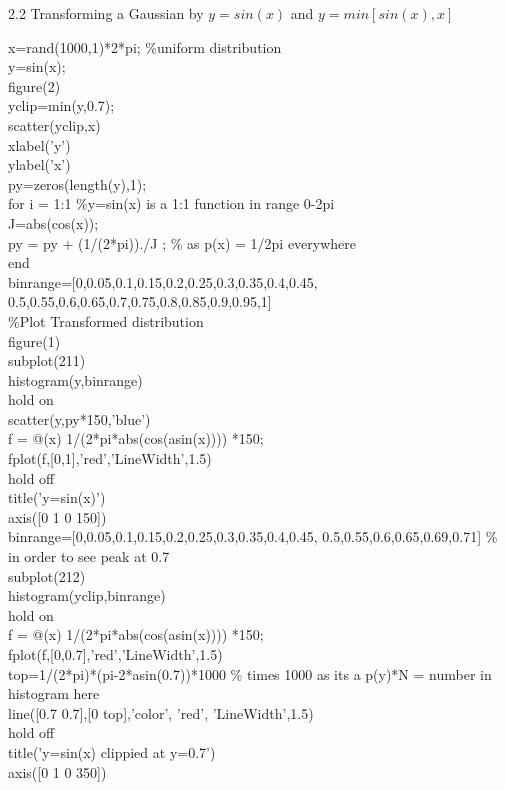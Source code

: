 \documentclass[twoside,twocolumn]{article}
\begin{document}
\begin{large}
2.2 Transforming a Gaussian by $y=sin(x)$ and $y=min[sin(x),x]$
\end{large}
\newline
\begin{itshape}
x=rand(1000,1)*2*pi; \%uniform distribution\\
y=sin(x);\\
figure(2)\\
yclip=min(y,0.7);\\
scatter(yclip,x)\\
xlabel('y')\\
ylabel('x')\\
py=zeros(length(y),1);\\
for i = 1:1 \%y=sin(x) is a 1:1 function in range 0-2pi  \\
    J=abs(cos(x));\\
    py = py + (1/(2*pi))./J ; \% as p(x) = 1/2pi everywhere \\
end\\

binrange=[0,0.05,0.1,0.15,0.2,0.25,0.3,0.35,0.4,0.45, 0.5,0.55,0.6,0.65,0.7,0.75,0.8,0.85,0.9,0.95,1]\\
\%Plot Transformed distribution\\
figure(1)\\
subplot(211)\\
histogram(y,binrange)\\
hold on\\
scatter(y,py*150,'blue')\\
f = @(x) 1/(2*pi*abs(cos(asin(x)))) *150;\\ 
fplot(f,[0,1],'red','LineWidth',1.5)\\
hold off\\
title('y=sin(x)')\\
axis([0 1 0 150])\\
binrange=[0,0.05,0.1,0.15,0.2,0.25,0.3,0.35,0.4,0.45, 0.5,0.55,0.6,0.65,0.69,0.71] \% in order to see peak at 0.7\\
subplot(212)\\
histogram(yclip,binrange)\\
hold on\\
f = @(x) 1/(2*pi*abs(cos(asin(x)))) *150; \\
fplot(f,[0,0.7],'red','LineWidth',1.5)\\
top=1/(2*pi)*(pi-2*asin(0.7))*1000 \% times 1000 as its a p(y)*N = number in histogram here\\
line([0.7 0.7],[0 top],'color', 'red', 'LineWidth',1.5)\\
hold off\\
title('y=sin(x) clippied at y=0.7')\\
axis([0 1 0 350])\\
\end{itshape}
\end{document}
